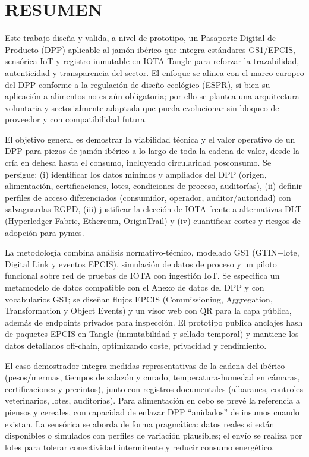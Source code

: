 \chapter*{RESUMEN}

Este trabajo diseña y valida, a nivel de prototipo, un Pasaporte Digital de Producto (DPP) aplicable al jamón ibérico que integra estándares GS1/EPCIS, sensórica IoT y registro inmutable en IOTA Tangle para reforzar la trazabilidad, autenticidad y transparencia del sector. El enfoque se alinea con el marco europeo del DPP conforme a la regulación de diseño ecológico (ESPR), si bien su aplicación a alimentos no es aún obligatoria; por ello se plantea una arquitectura voluntaria y sectorialmente adaptada que pueda evolucionar sin bloqueo de proveedor y con compatibilidad futura.

El objetivo general es demostrar la viabilidad técnica y el valor operativo de un DPP para piezas de jamón ibérico a lo largo de toda la cadena de valor, desde la cría en dehesa hasta el consumo, incluyendo circularidad posconsumo. Se persigue: (i) identificar los datos mínimos y ampliados del DPP (origen, alimentación, certificaciones, lotes, condiciones de proceso, auditorías), (ii) definir perfiles de acceso diferenciados (consumidor, operador, auditor/autoridad) con salvaguardas RGPD, (iii) justificar la elección de IOTA frente a alternativas DLT (Hyperledger Fabric, Ethereum, OriginTrail) y (iv) cuantificar costes y riesgos de adopción para pymes.

La metodología combina análisis normativo-técnico, modelado GS1 (GTIN+lote, Digital Link y eventos EPCIS), simulación de datos de proceso y un piloto funcional sobre red de pruebas de IOTA con ingestión IoT. Se especifica un metamodelo de datos compatible con el Anexo de datos del DPP y con vocabularios GS1; se diseñan flujos EPCIS (Commissioning, Aggregation, Transformation y Object Events) y un visor web con QR para la capa pública, además de endpoints privados para inspección. El prototipo publica anclajes hash de paquetes EPCIS en Tangle (inmutabilidad y sellado temporal) y mantiene los datos detallados off-chain, optimizando coste, privacidad y rendimiento.

El caso demostrador integra medidas representativas de la cadena del ibérico (pesos/mermas, tiempos de salazón y curado, temperatura-humedad en cámaras, certificaciones y precintos), junto con registros documentales (albaranes, controles veterinarios, lotes, auditorías). Para alimentación en cebo se prevé la referencia a piensos y cereales, con capacidad de enlazar DPP “anidados” de insumos cuando existan. La sensórica se aborda de forma pragmática: datos reales si están disponibles o simulados con perfiles de variación plausibles; el envío se realiza por lotes para tolerar conectividad intermitente y reducir consumo energético.

